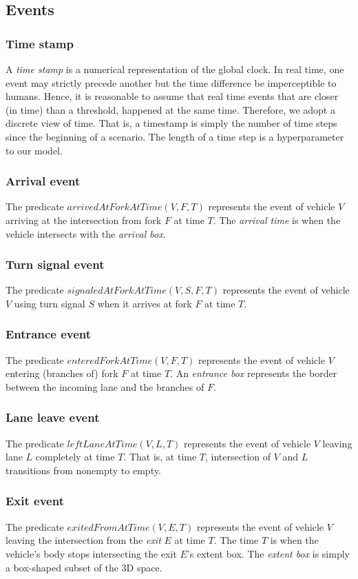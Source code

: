 \subsection{Events}

\subsubsection{Time stamp}
A \emph{time stamp} is a numerical representation of the global clock.
In real time,
one event may strictly precede another but the time difference be imperceptible to humans.
Hence, it is reasonable to assume that
real time events that are closer (in time) than a threshold,
happened at the same time.
Therefore, we adopt a discrete view of time.
That is, a timestamp is simply the number of time steps since the beginning of a scenario.
The length of a time step is a hyperparameter to our model.
\subsubsection{Arrival event}
The predicate $arrivedAtForkAtTime(V, F, T)$ represents
the event of vehicle $V$ arriving at the intersection
from fork $F$ at time $T$.
The \emph{arrival time} is when the vehicle intersects with the \emph{arrival box}.
\subsubsection{Turn signal event}
The predicate $signaledAtForkAtTime(V, S, F, T)$ represents
the event of vehicle $V$ using turn signal $S$
when it arrives at fork $F$ at time $T$.
\subsubsection{Entrance event}
The predicate $enteredForkAtTime(V, F, T)$ represents
the event of vehicle $V$ entering (branches of) fork $F$ at time $T$.
An \emph{entrance box} represents
the border between the incoming lane and the branches of $F$.
\subsubsection{Lane leave event}
The predicate $leftLaneAtTime(V, L, T)$ represents
the event of vehicle $V$ leaving lane $L$ completely at time $T$.
That is,
at time $T$,
intersection of $V$ and $L$ transitions from nonempty to empty.
\subsubsection{Exit event}
The predicate $ exitedFromAtTime(V, E, T) $ represents the event of
vehicle $V$ leaving the intersection
from the \emph{exit} $E$
at time $T$.
The time $T$ is when the vehicle's body stops intersecting
the exit $E$'s extent box.
The \emph{extent box} is simply a box-shaped subset of the 3D space.

